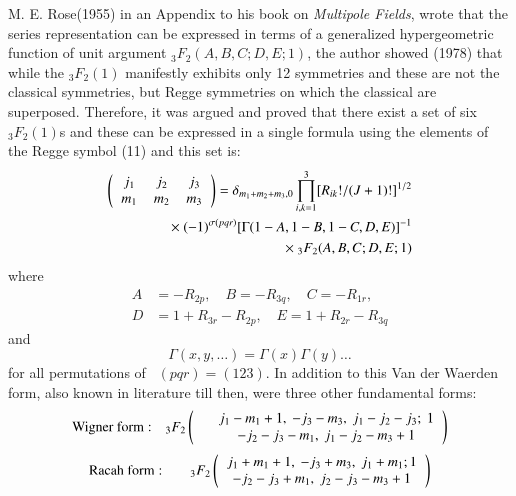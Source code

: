 M. E. Rose(1955) in an Appendix to his book on \textit{Multipole Fields}, wrote that the series representation can be expressed in terms of a generalized hypergeometric function of unit argument ${}_3F_2(A, B, C; D, E; 1)$,  the author showed (1978) that while the $_3F_2(1)$ manifestly exhibits only 12 symmetries and these are not the classical symmetries, but Regge symmetries on which the classical are superposed. Therefore, it was argued and proved that there exist a set of six $_3F_2(1)$s and these can be expressed in a single formula using the elements of the Regge symbol (11) and this set is:
\begin{equation}
\begin{split}
\left(
\begin{tabular}{ccc}
$j_1$&  $j_2$& $j_3$ \\ $m_1$& $m_2$& $m_3$ \\ 
\end{tabular}
\right) 
=  \delta_{m_1+m_2+m_3,0} \prod_{i,k=1}^3 [R_{ik}!/(J+1)!]^{1/2}\\
\times \ (-1)^{\sigma(pqr)} [\Gamma(1-A, 1-B, 1-C, D, E)]^{-1}\\
\times \ {}_3F_2(A, B, C; D, E; 1)\hfill \label{chap7-eq13}
\end{split}
\end{equation}
where
\begin{equation}
\begin{split}
A & =-R_{2p},\quad B=-R_{3q},\quad C=-R_{1r},\\
D & =1+R_{3r}-R_{2p},\quad E=1+R_{2r}-R_{3q} \label{chap7-eq14}
\end{split}
\end{equation}
and 
\begin{equation}
\Gamma(x,y,\ldots)=\Gamma(x)\Gamma(y)\ldots \label{chap7-eq15}
\end{equation}
for all permutations of \ $(pqr)=(123)$. In addition to this Van der Waerden form, also known in literature till then, were three other fundamental forms:
\begin{equation}
{\rm Wigner\ form:}\quad {}_3F_2
\left(
\begin{tabular}{lc}
&$j_1-m_1+1,\ -j_3-m_3,\ j_1-j_2-j_3;\ 1$\\
&$-j_2-j_3-m_1,\ j_1-j_2-m_3+1$\\ 
\end{tabular} 
\right) \label{chap7-eq16}
\end{equation}
\smallskip
\begin{equation}
{\rm Racah\ form:}\qquad {}_3F_2
\left(
\begin{tabular}{c}
$j_1+m_1+1,\ -j_3+m_3,\ j_1+m_1; 1$\\
$-j_2-j_3+m_1,\ j_2-j_3-m_3+1$\\ 
\end{tabular} 
\right) \label{chap7-eq17}
\end{equation}
